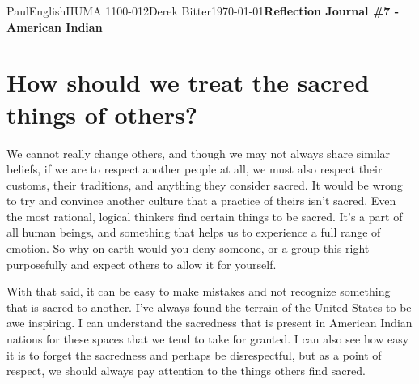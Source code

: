 \documentclass[12pt,letterpaper]{article}
\begin{document}
\begin{mla}{Paul}{English}{HUMA 1100-012}{Derek Bitter}{\today}{\textbf{Reflection Journal \#7 - American Indian}}

\section{How should we treat the sacred things of others?}



We cannot really change others, and though we may not always share
similar beliefs, if we are to respect another people at all, we must
also respect their customs, their traditions, and anything they
consider sacred. It would be wrong to try and convince another culture
that a practice of theirs isn't sacred. Even the most rational,
logical thinkers find certain things to be sacred. It's a part of all
human beings, and something that helps us to experience a full range
of emotion. So why on earth would you deny someone, or a group this
right purposefully and expect others to allow it for yourself.

With that said, it can be easy to make mistakes and not recognize
something that is sacred to another. I've always found the terrain of
the United States to be awe inspiring. I can understand the sacredness
that is present in American Indian nations for these spaces that we
tend to take for granted. I can also see how easy it is to forget the
sacredness and perhaps be disrespectful, but as a point of respect, we
should always pay attention to the things others find sacred.

\end{mla}
\end{document}
